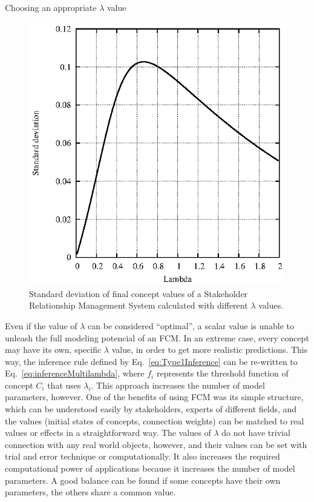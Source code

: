 \documentclass[graybox]{svmult}
\begin{document}
\begin{backgroundinformation}{Choosing an appropriate $\lambda$ value}
\begin{figure}[hbt]
  \begin{center}
    \includegraphics[scale=.9]{ascc2015plots/stdDev.eps}
  \end{center}
  \caption{Standard deviation of final concept values of a Stakeholder Relationship Management System calculated with different $\lambda$ values.}
  \label{fig:standardDeviation}
\end{figure}

Even if the value of $\lambda$ can be considered ``optimal'', a scalar value is unable to unleash the full modeling potencial of an FCM. In an extreme case, every concept may have its own, specific $\lambda$ value, in order to get more realistic predictions. This way, the inference rule defined by Eq.~\ref{eq:Type1Inference} can be re-written to Eq.~\ref{eq:inferenceMultilambda}, where $f_i$ represents the threshold function of concept $C_i$ that uses $\lambda_i$. This approach increases the number of model parameters, however. One of the benefits of using FCM was its simple structure, which can be understood easily by stakeholders, experts of different fields, and the values (initial states of concepts, connection weights) can be matched to real values or effects in a straightforward way. The values of $\lambda$ do not have trivial connection with any real world objects, however, and their values can be set with trial and error technique or computationally. It also increases the required computational power of applications because it increases the number of model parameters. A good balance can be found if some concepts have their own parameters, the others share a common value.


\end{backgroundinformation}
\end{document}
